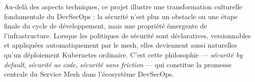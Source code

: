Au-delà des aspects techniques, ce projet illustre une transformation culturelle
fondamentale du DevSecOps : la sécurité n'est plus un obstacle ou une étape
finale du cycle de développement, mais une propriété émergente de l'infrastructure.
Lorsque les politiques de sécurité sont déclaratives, versionnables et appliquées
automatiquement par le mesh, elles deviennent aussi naturelles qu'un déploiement
Kubernetes ordinaire. C'est cette philosophie --- \textit{sécurité by default},
\textit{sécurité as code}, \textit{sécurité sans friction} --- qui constitue la
promesse centrale du Service Mesh dans l'écosystème DevSecOps.